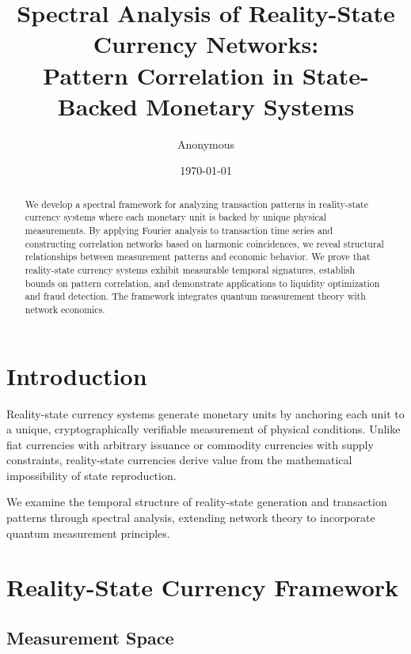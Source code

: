 \documentclass[12pt]{article}
\title{Spectral Analysis of Reality-State Currency Networks:\\
Pattern Correlation in State-Backed Monetary Systems}
\author{Anonymous}
\date{\today}
\begin{document}
\maketitle

\begin{abstract}
We develop a spectral framework for analyzing transaction patterns in reality-state currency systems where each monetary unit is backed by unique physical measurements. By applying Fourier analysis to transaction time series and constructing correlation networks based on harmonic coincidences, we reveal structural relationships between measurement patterns and economic behavior. We prove that reality-state currency systems exhibit measurable temporal signatures, establish bounds on pattern correlation, and demonstrate applications to liquidity optimization and fraud detection. The framework integrates quantum measurement theory with network economics.
\end{abstract}

\section{Introduction}

Reality-state currency systems generate monetary units by anchoring each unit to a unique, cryptographically verifiable measurement of physical conditions. Unlike fiat currencies with arbitrary issuance or commodity currencies with supply constraints, reality-state currencies derive value from the mathematical impossibility of state reproduction.

We examine the temporal structure of reality-state generation and transaction patterns through spectral analysis, extending network theory to incorporate quantum measurement principles.

\section{Reality-State Currency Framework}

\subsection{Measurement Space}
\end{document}
